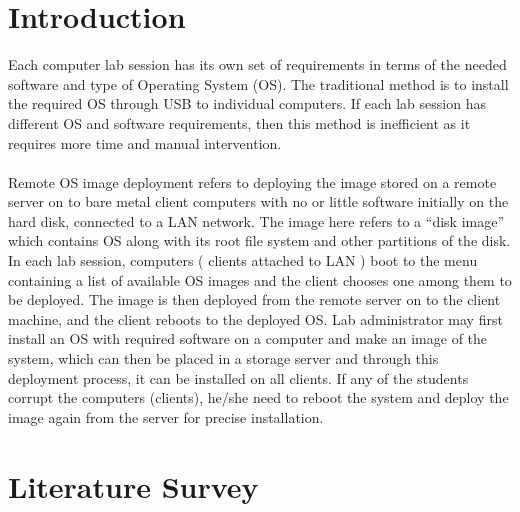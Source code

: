 \documentclass[a4paper,12pt]{article}
\begin{document}

\newpage
\tableofcontents


\newpage
\listoffigures


\newpage	
        


\section{\fontsize{16pt}{1em} Introduction}
Each computer lab session has its own set of requirements in terms of the needed software and type of Operating System (OS). The traditional method is to install the required OS through USB to individual computers. If each lab session has different OS and software requirements, then this method is inefficient as it requires more time and manual intervention.
\paragraph{}
Remote OS image deployment refers to deploying the image stored on a remote server on to bare metal client computers with no or little software initially on the hard disk,  connected to a LAN  network. The image here refers to a “disk image” which contains OS along with its root file system and other partitions of the disk. 
In each lab session, computers ( clients attached to LAN ) boot to the menu containing a list of available OS images and the client chooses one among them to be deployed. The image is then deployed from the remote server on to the client machine, and the client reboots to the deployed OS. Lab administrator may first install an OS with required software on a computer and make an image of the system, which can then be placed in a storage server and through this deployment process, it can be installed on all clients. If any of the students corrupt the computers (clients), he/she need to reboot the system and deploy the image again from the server for precise installation. 
\vspace{0.5cm}

\newpage
\section{\fontsize{16pt}{1em}  Literature Survey}
\end{document}
